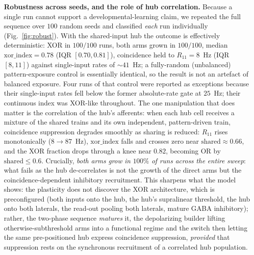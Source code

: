 \documentclass[11pt,a4paper]{article}
\begin{document}
\textbf{Robustness across seeds, and the role of hub correlation.} Because a single run cannot support a developmental-learning claim, we repeated the full sequence over $100$ random seeds and classified \emph{each} run individually (Fig.~\ref{fig:robust}). With the shared-input hub the outcome is effectively deterministic: XOR in $100/100$ runs, both arms grown in $100/100$, median $\mathrm{xor\_index}=0.78$ (IQR $[0.70,0.81]$), coincidence held to $R_{11}=8$~Hz (IQR $[8,11]$) against single-input rates of ${\sim}41$~Hz; a fully-random (unbalanced) pattern-exposure control is essentially identical, so the result is not an artefact of balanced exposure. Four runs of that control were reported as exceptions because their single-input rates fell below the former absolute-rate gate at $25$~Hz; their continuous index was XOR-like throughout. The one manipulation that does matter is the correlation of the hub's afferents: when each hub cell receives a mixture of the shared trains and its own independent, pattern-driven train, coincidence suppression degrades smoothly as sharing is reduced: $R_{11}$ rises monotonically ($8\to87$~Hz), $\mathrm{xor\_index}$ falls and crosses zero near $\mathrm{shared}\approx0.66$, and the XOR fraction drops through a knee near $0.82$, becoming OR by $\mathrm{shared}\leq0.6$. Crucially, \emph{both arms grow in $100\%$ of runs across the entire sweep}: what fails as the hub de-correlates is not the growth of the direct arms but the coincidence-dependent inhibitory recruitment. This sharpens what the model shows: the plasticity does not discover the XOR architecture, which is preconfigured (both inputs onto the hub, the hub's supralinear threshold, the hub onto both laterals, the read-out pooling both laterals, mature GABA inhibitory); rather, the two-phase sequence \emph{matures} it, the depolarizing builder lifting otherwise-subthreshold arms into a functional regime and the switch then letting the same pre-positioned hub express coincidence suppression, \emph{provided} that suppression rests on the synchronous recruitment of a correlated hub population.
\end{document}

